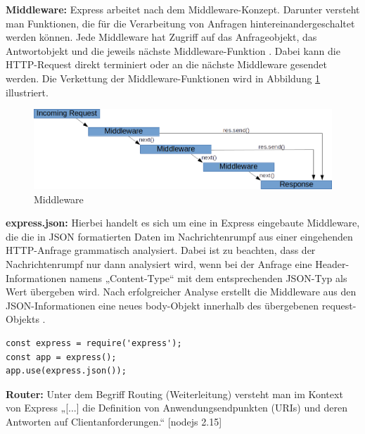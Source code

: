 \noindent
\textbf{Middleware:}
Express arbeitet nach dem Middleware-Konzept. Darunter versteht man Funktionen, die für die Verarbeitung von Anfragen hintereinandergeschaltet werden können. Jede Middleware hat Zugriff auf das Anfrageobjekt, das Antwortobjekt und die jeweils nächste Middleware-Funktion \cite{Node1.9}.
Dabei kann die HTTP-Request direkt terminiert oder an die nächste Middleware gesendet werden. Die Verkettung der Middleware-Funktionen wird in Abbildung \ref{fig:middleware} illustriert.
\newline

\begin{figure}[tbt]
\centering
\includegraphics[width=12cm]{images/nodejs_middleware.png}
\caption[Middleware]{Middleware \cite{Node1.2}}
\label{fig:middleware}
\end{figure}

%
%

\noindent
\textbf{express.json:}
Hierbei handelt es sich um eine in Express eingebaute Middleware, die die in JSON formatierten Daten im Nachrichtenrumpf aus einer eingehenden HTTP-Anfrage grammatisch analysiert.  Dabei ist zu beachten, dass der Nachrichtenrumpf nur dann analysiert wird, wenn bei der Anfrage eine Header-Informationen namens „Content-Type“ mit dem entsprechenden JSON-Typ als Wert übergeben wird. Nach erfolgreicher Analyse erstellt die Middleware aus den JSON-Informationen eine neues body-Objekt innerhalb des übergebenen request-Objekts \cite{Node2.1}.
\newline

\begin{lstlisting}[caption=Express.json Middleware benutzen,label=lst:ExpressNutzen]
const express = require('express');
const app = express();
app.use(express.json());
\end{lstlisting}

%
%

\noindent
\textbf{Router:}
Unter dem Begriff Routing (Weiterleitung) versteht man im Kontext von Express „[...] die Definition von Anwendungsendpunkten (URIs) und deren Antworten auf Clientanforderungen.“ [nodejs 2.15]
\newline

